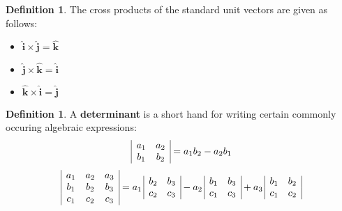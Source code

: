 \documentclass[letterpaper, twoside, 12pt]{book}
\newcommand{\<}{\langle}
\renewcommand{\>}{\rangle}
\theoremstyle{definition}
\theoremstyle{definition}
\newtheorem{definition}[theorem]{Definition}
\newcommand{\veci}{\ensuremath{\mathbf{\widehat{i}}}}
\newcommand{\vecj}{\ensuremath{\mathbf{\widehat{j}}}}
\newcommand{\veck}{\ensuremath{\mathbf{\widehat{k}}}}
\begin{document}
  \begin{definition}
    The cross products of the standard unit vectors are given as follows:
    \begin{itemize}
      \item $\veci \times \vecj = \veck$
      \item $\vecj \times \veck = \veci$
      \item $\veck \times \veci = \vecj$
    \end{itemize}
  \end{definition}

  \begin{definition}
    A \textbf{determinant} is a short hand for writing certain commonly
    occuring algebraic expressions:
      \[
        \begin{array}{|c c|}
        a_1 & a_2 \\
        b_1 & b_2 \\
        \end{array}
          =
        a_1b_2 - a_2b_1
      \]
      \[
        \begin{array}{|c c c|}
        a_1 & a_2 & a_3 \\
        b_1 & b_2 & b_3 \\
        c_1 & c_2 & c_3 \\
        \end{array}
          =
        a_1 \,
        \begin{array}{|c c|}
        b_2 & b_3 \\
        c_2 & c_3 \\
        \end{array}
          -
        a_2 \,
        \begin{array}{|c c|}
        b_1 & b_3 \\
        c_1 & c_3 \\
        \end{array}
          +
        a_3 \,
        \begin{array}{|c c|}
        b_1 & b_2 \\
        c_1 & c_2 \\
        \end{array}
      \]
  \end{definition}

\newpage
\end{document}
